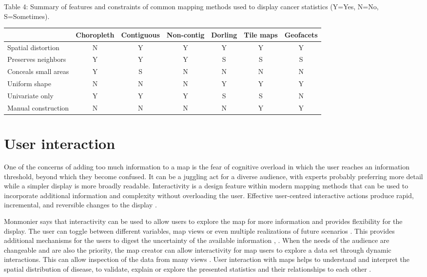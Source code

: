 \documentclass{monashthesis}
\begin{document}
Table 4: Summary of features and constraints of common mapping methods used to display cancer statistics (Y=Yes, N=No, S=Sometimes).

\begin{longtable}[]{@{}lcccccc@{}}
\toprule
& Choropleth & Contiguous & Non-contig & Dorling & Tile maps & Geofacets\tabularnewline
\midrule
\endhead
Spatial distortion & N & Y & Y & Y & Y & Y\tabularnewline
Preserves neighbors & Y & Y & Y & S & S & S\tabularnewline
Conceals small areas & Y & S & N & N & N & N\tabularnewline
Uniform shape & N & N & N & Y & Y & Y\tabularnewline
Univariate only & Y & Y & Y & S & S & N\tabularnewline
Manual construction & N & N & N & N & Y & Y\tabularnewline
\bottomrule
\end{longtable}

\hypertarget{ch:interacting}{%
\section{User interaction}\label{ch:interacting}}

One of the concerns of adding too much information to a map is the fear of cognitive overload \autocite{mcgranaghan1993cartographic} in which the user reaches an information threshold, beyond which they become confused. It can be a juggling act for a diverse audience, with experts probably preferring more detail \autocite{cliburn2002design} while a simpler display is more broadly readable. Interactivity is a design feature within modern mapping methods that can be used to incorporate additional information and complexity without overloading the user. Effective user-centred interactive actions produce rapid, incremental, and reversible changes to the display \autocite{DMIV}.

Monmonier \autocite{HTLWM} says that interactivity can be used to allow users to explore the map for more information and provides flexibility for the display. The user can toggle between different variables, map views or even multiple realizations of future scenarios \autocite{goodchild1994introduction}. This provides additional mechanisms for the users to digest the uncertainty of the available information \autocite{maceachren1992visualizing}, \autocite{van1994visualization}. When the needs of the audience are changeable and are also the priority, the map creator can allow interactivity for map users to explore a data set through dynamic interactions. This can allow inspection of the data from many views \autocite{DQBCM}. User interaction with maps helps to understand and interpret the spatial distribution of disease, to validate, explain or explore the presented statistics and their relationships to each other \autocite{TNTEA}.
\end{document}

